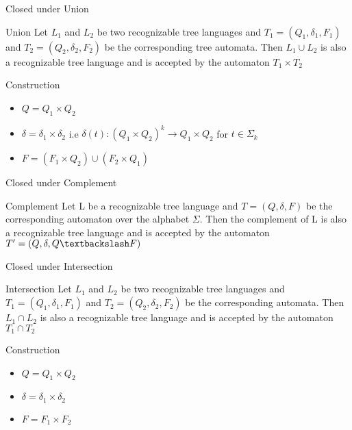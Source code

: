\documentclass[10pt,svgnames,fragile]{beamer}
\begin{document}
\begin{frame}{Closed under Union}
    \begin{block}{Union}
        Let $L_1$ and $L_2$ be two recognizable tree languages and
$T_1 = (Q_1, \delta_1, F_1)$ and $T_2 = (Q_2, \delta_2, F_2)$ be the corresponding
tree automata. Then $L_1 \cup L_2$ is also a recognizable tree
language and is accepted by the automaton $T_1 \times T_2$
    \end{block}
    \pause
    \begin{block}{Construction}
        \begin{itemize}
            \item $Q = Q_1 \times Q_2$
            \item $\delta = \delta_1 \times \delta_2  $  i.e $\delta(t) : (Q_1 \times Q_2)^k \rightarrow Q_1 \times Q_2$ for $t \in \Sigma_k$
            \item $F = (F_1 \times Q_2) \cup (F_2 \times Q_1)$
        \end{itemize}
    \end{block}
\end{frame}

\begin{frame}{Closed under Complement}
    \begin{block}{Complement}
        Let L be a recognizable tree language and $T = (Q, \delta, F)$ be the
corresponding automaton over the alphabet $\Sigma$. Then the complement of L is also
a recognizable tree language and is accepted by the
automaton $T' = (Q, \delta, Q \textbackslash F)$
    \end{block}
\end{frame}

\begin{frame}{Closed under Intersection}
    \begin{block}{Intersection}
        Let $L_1$ and $L_2$ be two recognizable tree languages and
$T_1 = (Q_1, \delta_1, F_1)$ and $T_2 = (Q_2, \delta_2, F_2)$ be the corresponding
automata. Then $L_1 \cap L_2$ is also a recognizable tree language
and is accepted by the automaton$ T_1 \cap T_2$
    \end{block}
    \pause
    \begin{block}{Construction}
        \begin{itemize}
            \item $Q = Q_1 \times Q_2$
            \item $\delta = \delta_1 \times \delta_2$
            \item $F = F_1 \times F_2 $
        \end{itemize}
    \end{block}
\end{frame}
\end{document}
